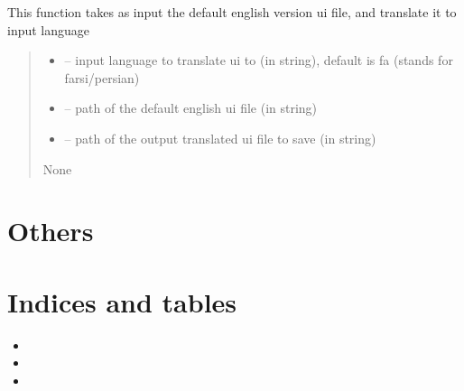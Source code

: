 \documentclass[letterpaper,10pt,english]{sphinxmanual}
\begin{document}
\begin{savenotes}\begin{fulllineitems}
\label{\detokenize{setting/translate_ui:oxin.translate_ui.translate_ui}}
\pysigstartsignatures
{}
\pysigstopsignatures
\sphinxAtStartPar
This function takes as input the default english version ui file, and translate it to input language
\begin{quote}\begin{description}
\begin{itemize}
\item {} 
\sphinxAtStartPar
{} – input language to translate ui to (in string), default is fa (stands for farsi/persian)

\item {} 
\sphinxAtStartPar
{} – path of the default english ui file (in string)

\item {} 
\sphinxAtStartPar
{} – path of the output translated ui file to save (in string)

\end{itemize}

\sphinxAtStartPar
None

\end{description}\end{quote}

\end{fulllineitems}\end{savenotes}


\sphinxstepscope


\chapter{Others}
\label{\detokenize{Others:others}}\label{\detokenize{Others::doc}}

\chapter{Indices and tables}
\label{\detokenize{index:indices-and-tables}}\begin{itemize}
\item {} 
\sphinxAtStartPar
{}

\item {} 
\sphinxAtStartPar
{}

\item {} 
\sphinxAtStartPar
{}

\end{itemize}
\end{document}
